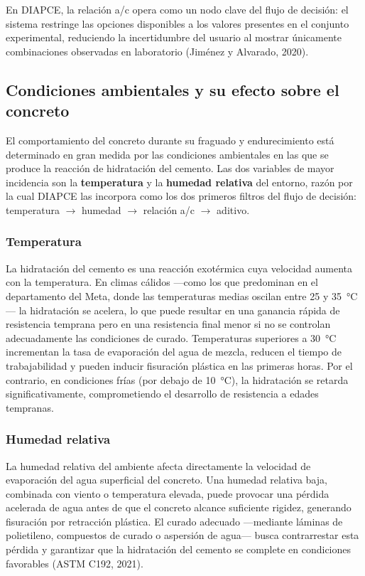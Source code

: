 En DIAPCE, la relación a/c opera como un nodo clave del flujo de decisión: el sistema restringe las opciones disponibles a los valores presentes en el conjunto experimental, reduciendo la incertidumbre del usuario al mostrar únicamente combinaciones observadas en laboratorio (Jiménez y Alvarado, 2020).

\subsection{Condiciones ambientales y su efecto sobre el concreto}

El comportamiento del concreto durante su fraguado y endurecimiento está determinado en gran medida por las condiciones ambientales en las que se produce la reacción de hidratación del cemento. Las dos variables de mayor incidencia son la \textbf{temperatura} y la \textbf{humedad relativa} del entorno, razón por la cual DIAPCE las incorpora como los dos primeros filtros del flujo de decisión: temperatura $\rightarrow$ humedad $\rightarrow$ relación a/c $\rightarrow$ aditivo.

\subsubsection*{Temperatura}

La hidratación del cemento es una reacción exotérmica cuya velocidad aumenta con la temperatura. En climas cálidos —como los que predominan en el departamento del Meta, donde las temperaturas medias oscilan entre 25 y 35~°C— la hidratación se acelera, lo que puede resultar en una ganancia rápida de resistencia temprana pero en una resistencia final menor si no se controlan adecuadamente las condiciones de curado. Temperaturas superiores a 30~°C incrementan la tasa de evaporación del agua de mezcla, reducen el tiempo de trabajabilidad y pueden inducir fisuración plástica en las primeras horas. Por el contrario, en condiciones frías (por debajo de 10~°C), la hidratación se retarda significativamente, comprometiendo el desarrollo de resistencia a edades tempranas.

\subsubsection*{Humedad relativa}

La humedad relativa del ambiente afecta directamente la velocidad de evaporación del agua superficial del concreto. Una humedad relativa baja, combinada con viento o temperatura elevada, puede provocar una pérdida acelerada de agua antes de que el concreto alcance suficiente rigidez, generando fisuración por retracción plástica. El curado adecuado —mediante láminas de polietileno, compuestos de curado o aspersión de agua— busca contrarrestar esta pérdida y garantizar que la hidratación del cemento se complete en condiciones favorables (ASTM C192, 2021).

